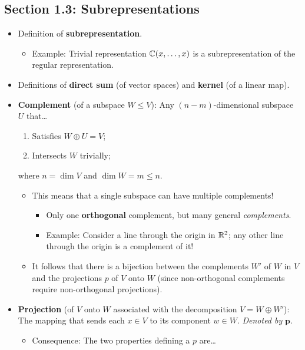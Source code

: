 \documentclass[../notes.tex]{subfiles}
\begin{document}
\subsection*{Section 1.3: Subrepresentations}
\begin{itemize}
    \item Definition of \textbf{subrepresentation}.
    \begin{itemize}
        \item Example: Trivial representation $\mathbb{C}(x,\dots,x)$ is a subrepresentation of the regular representation.
    \end{itemize}
    \item Definitions of \textbf{direct sum} (of vector spaces) and \textbf{kernel} (of a linear map).
    \item \textbf{Complement} (of a subspace $W\leq V$): Any $(n-m)$-dimensional subspace $U$ that\dots
    \begin{enumerate}
        \item Satisfies $W\oplus U=V$;
        \item Intersects $W$ trivially;
    \end{enumerate}
    where $n=\dim V$ and $\dim W=m\leq n$.
    \begin{itemize}
        \item This means that a single subspace can have multiple complements!
        \begin{itemize}
            \item Only one \textbf{orthogonal} complement, but many general \emph{complements}.
            \item Example: Consider a line through the origin in $\mathbb{R}^2$; any other line through the origin is a complement of it!
        \end{itemize}
        \item It follows that there is a bijection between the complements $W'$ of $W$ in $V$ and the projections $p$ of $V$ onto $W$ (since non-orthogonal complements require non-orthogonal projections).
    \end{itemize}
    \item \textbf{Projection} (of $V$ onto $W$ associated with the decomposition $V=W\oplus W'$): The mapping that sends each $x\in V$ to its component $w\in W$. \emph{Denoted by} $\bm{p}$.
    \begin{itemize}
        \item Consequence: The two properties defining a $p$ are\dots
        \begin{enumerate}

\end{enumerate}
\end{itemize}
\end{itemize}
\end{document}

